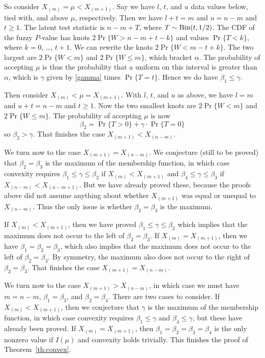 \documentclass{article}
\newcommand{\BinomialDis}{\text{\upshape Bin}}
\begin{document}
So consider $X_{(m)} = \mu < X_{(m + 1)}$.
Say we have $l$, $t$, and $u$ data values below, tied with, and above
$\mu$, respectively.
Then we have $l + t = m$ and $u = n - m$ and $t \ge 1$.
The latent test statistic is $n - m + T$,
where $T \sim \BinomialDis(t, 1 / 2)$.
The CDF of the fuzzy $P$-value has
knots $2 \Pr\{ W > n - m + t - k \}$ and
values $\Pr\{ T < k \}$, where $k = 0$, \ldots, $t + 1$.
We can rewrite the
knots $2 \Pr\{ W < m - t + k \}$.  The two largest
are $2 \Pr \{ W < m \}$ and $2 \Pr \{ W \le m \}$, which bracket $\alpha$.
The probability of accepting $\mu$ is thus the probability that a uniform
on this interval is greater than $\alpha$, which is $\gamma$ given by
\eqref{gamma} times $\Pr \{ T = t \}$.  Hence we do have $\beta_1 \le \gamma$.

Then consider $X_{(m)} < \mu = X_{(m + 1)}$.
With $l$, $t$, and $u$ as above,
we have $l = m$ and $u + t = n - m$ and $t \ge 1$.
Now the two smallest knots
are $2 \Pr \{ W < m \}$ and $2 \Pr \{ W \le m \}$.
The probability of accepting $\mu$ is now
$$
   \beta_2 = \Pr\{ T > 0 \} + \gamma \cdot \Pr \{ T = 0 \}
$$
so $\beta_2 > \gamma$.
That finishes the case $X_{(m + 1)} < X_{(n - m)}$.

We turn now to the case $X_{(m + 1)} = X_{(n - m)}$.  We conjecture
(still to be proved)
that $\beta_2 = \beta_3$ is the maximum of the membership function,
in which case convexity requires
$\beta_1 \le \gamma \le \beta_2$ if $X_{(m)} < X_{(m + 1)}$
and
$\beta_4 \le \gamma \le \beta_3$ if $X_{(n - m)} < X_{(n - m + 1)}$.
But we have already proved these, because the proofs above did not assume
anything about whether $X_{(m + 1)}$ was equal or unequal to $X_{(n - m)}$.
Thus the only issue is whether $\beta_2 = \beta_3$ is the maximum.

If $X_{(m)} < X_{(m + 1)}$, then we have
proved $\beta_1 \le \gamma \le \beta_2$ which implies that the maximum
does not occur to the left of $\beta_2 = \beta_3$.
If $X_{(m)} = X_{(m + 1)}$, then we have $\beta_1 = \beta_2 = \beta_3$,
which also implies that the maximum
does not occur to the left of $\beta_2 = \beta_3$.
By symmetry, the maximum also
does not occur to the right of $\beta_2 = \beta_3$.
That finishes the case $X_{(m + 1)} = X_{(n - m)}$.

We turn now to the case $X_{(m + 1)} > X_{(n - m)}$, in which case we
must have $m = n - m$, $\beta_1 = \beta_3$, and $\beta_2 = \beta_4$.
There are two cases to consider.  If $X_{(m)} < X_{(m + 1)}$, then
we conjecture that $\gamma$ is the maximum of the membership function,
in which case convexity requires $\beta_1 \le \gamma$ and $\beta_4 \le \gamma$,
but these have already been proved.
If $X_{(m)} = X_{(m + 1)}$, then $\beta_1 = \beta_2 = \beta_3 = \beta_4$ is
the only nonzero value if $I(\mu)$ and convexity holds trivially.
This finishes the proof of Theorem~\ref{th:convex}.
\end{document}
